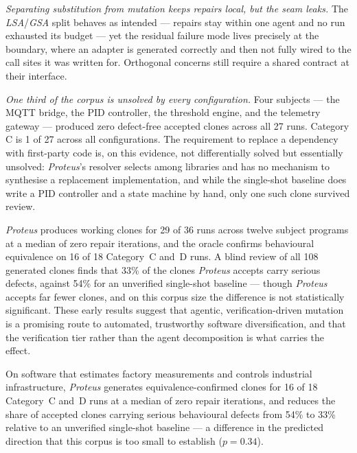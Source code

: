 \emph{Separating substitution from mutation keeps repairs local, but the seam
leaks.} The \emph{LSA}/\emph{GSA} split behaves as intended --- repairs stay
within one agent and no run exhausted its budget --- yet the residual failure
mode lives precisely at the boundary, where an adapter is generated correctly
and then not fully wired to the call sites it was written for. Orthogonal
concerns still require a shared contract at their interface.

\emph{One third of the corpus is unsolved by every configuration.} Four
subjects --- the MQTT bridge, the PID controller, the threshold engine, and the
telemetry gateway --- produced zero defect-free accepted clones across all 27
runs. Category C is 1 of 27 across all configurations. The requirement to
replace a dependency with first-party code is, on this evidence, not
differentially solved but essentially unsolved: \emph{Proteus}'s resolver
selects among libraries and has no mechanism to synthesise a replacement
implementation, and while the single-shot baseline does write a PID controller
and a state machine by hand, only one such clone survived review.


\emph{Proteus} produces working clones for 29 of 36 runs across twelve subject
programs at a median of zero repair iterations, and the oracle confirms
behavioural equivalence on 16 of 18 Category~C and~D runs. A blind review of
all 108 generated clones finds that 33\% of the clones \emph{Proteus} accepts
carry serious defects, against 54\% for an unverified single-shot baseline ---
though \emph{Proteus} accepts far fewer clones, and on this corpus size the
difference is not statistically significant. These early results suggest that
agentic, verification-driven mutation is a promising route to automated,
trustworthy software diversification, and that the verification tier rather
than the agent decomposition is what carries the effect.

On software that estimates factory measurements and controls industrial
infrastructure, \emph{Proteus} generates equivalence-confirmed clones for 16 of
18 Category~C and~D runs at a median of zero repair iterations, and reduces the
share of accepted clones carrying serious behavioural defects from 54\% to
33\% relative to an unverified single-shot baseline --- a difference in the
predicted direction that this corpus is too small to establish
($p=0.34$).
